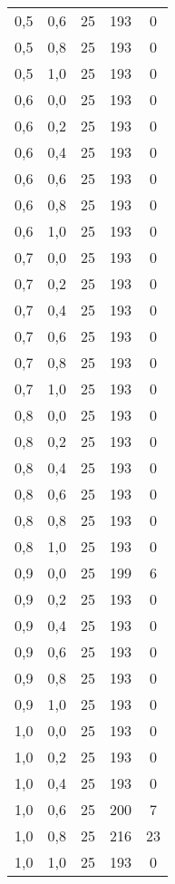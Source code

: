 \begin{center}
\begin{scriptsize}
\begin{longtable}[h]{| c | c | c || c | c |}
			0,5 & 0,6 & 25 & 193 & 0         \\
			0,5 & 0,8 & 25 & 193 & 0         \\
			0,5 & 1,0 & 25 & 193 & 0         \\
			\hline
			0,6 & 0,0 & 25 & 193 & 0         \\
			0,6 & 0,2 & 25 & 193 & 0         \\
			0,6 & 0,4 & 25 & 193 & 0         \\
			0,6 & 0,6 & 25 & 193 & 0         \\
			0,6 & 0,8 & 25 & 193 & 0         \\
			0,6 & 1,0 & 25 & 193 & 0         \\
			\hline
			0,7 & 0,0 & 25 & 193 & 0         \\
			0,7 & 0,2 & 25 & 193 & 0         \\
			0,7 & 0,4 & 25 & 193 & 0         \\
			0,7 & 0,6 & 25 & 193 & 0         \\
			0,7 & 0,8 & 25 & 193 & 0         \\
			0,7 & 1,0 & 25 & 193 & 0         \\
			\hline
			0,8 & 0,0 & 25 & 193 & 0         \\
			0,8 & 0,2 & 25 & 193 & 0         \\
			0,8 & 0,4 & 25 & 193 & 0         \\
			0,8 & 0,6 & 25 & 193 & 0         \\
			0,8 & 0,8 & 25 & 193 & 0         \\
			0,8 & 1,0 & 25 & 193 & 0         \\
			\hline
			0,9 & 0,0 & 25 & 199 & 6         \\
			0,9 & 0,2 & 25 & 193 & 0         \\
			0,9 & 0,4 & 25 & 193 & 0         \\
			0,9 & 0,6 & 25 & 193 & 0         \\
			0,9 & 0,8 & 25 & 193 & 0         \\
			0,9 & 1,0 & 25 & 193 & 0         \\
			\hline
			1,0 & 0,0 & 25 & 193 & 0         \\
			1,0 & 0,2 & 25 & 193 & 0         \\
			1,0 & 0,4 & 25 & 193 & 0         \\
			1,0 & 0,6 & 25 & 200 & 7         \\
			1,0 & 0,8 & 25 & 216 & 23        \\
			1,0 & 1,0 & 25 & 193 & 0         \\
			\hline
		\end{longtable}
	\end{scriptsize}
\end{center}


